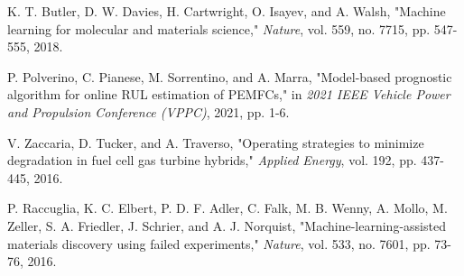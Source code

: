 \documentclass[conference]{IEEEtran}
\begin{document}
\begin{thebibliography}{99}
K. T. Butler, D. W. Davies, H. Cartwright, O. Isayev, and A. Walsh, "Machine learning for molecular and materials science," \textit{Nature}, vol. 559, no. 7715, pp. 547-555, 2018.

P. Polverino, C. Pianese, M. Sorrentino, and A. Marra, "Model-based prognostic algorithm for online RUL estimation of PEMFCs," in \textit{2021 IEEE Vehicle Power and Propulsion Conference (VPPC)}, 2021, pp. 1-6.

V. Zaccaria, D. Tucker, and A. Traverso, "Operating strategies to minimize degradation in fuel cell gas turbine hybrids," \textit{Applied Energy}, vol. 192, pp. 437-445, 2016.

P. Raccuglia, K. C. Elbert, P. D. F. Adler, C. Falk, M. B. Wenny, A. Mollo, M. Zeller, S. A. Friedler, J. Schrier, and A. J. Norquist, "Machine-learning-assisted materials discovery using failed experiments," \textit{Nature}, vol. 533, no. 7601, pp. 73-76, 2016.

\end{thebibliography}
\end{document}
